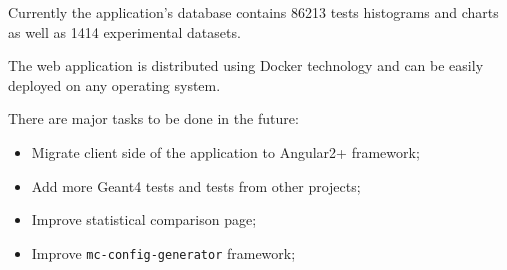 Currently the application's database contains 86213 tests histograms and charts as well as 1414 experimental datasets.

The web application is distributed using Docker technology and can be easily deployed on any operating system.

There are major tasks to be done in the future:
\begin{itemize}
	\item Migrate client side of the application to Angular2+ framework;
	\item Add more Geant4 tests and tests from other projects;
	\item Improve statistical comparison page;
	\item Improve {\tt mc-config-generator} framework;
\end{itemize}